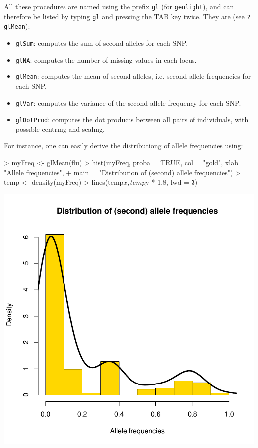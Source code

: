 \documentclass{article}
\begin{document}
All these procedures are named using the prefix \texttt{gl} (for \texttt{genlight}), and can therefore be listed by
typing \texttt{gl} and pressing the TAB key twice.
They are (see \texttt{?glMean}):
\begin{itemize}
\item \texttt{glSum}: computes the sum of second alleles for each SNP.
\item \texttt{glNA}: computes the number of missing values in each locus.
\item \texttt{glMean}: computes the mean of second alleles, i.e. second allele frequencies for
  each SNP.
\item \texttt{glVar}: computes the variance of the second allele frequency for each SNP.
\item \texttt{glDotProd}: computes the dot products between all pairs of individuals, with
  possible centring and scaling.
\end{itemize}
For instance, one can easily derive the distributiong of allele frequencies using:
\begin{Schunk}
\begin{Sinput}
> myFreq <- glMean(flu)
> hist(myFreq, proba = TRUE, col = "gold", xlab = "Allele frequencies", 
+     main = "Distribution of (second) allele frequencies")
> temp <- density(myFreq)
> lines(temp$x, temp$y * 1.8, lwd = 3)
\end{Sinput}
\end{Schunk}
\includegraphics{figs/genomics-037}
\end{document}

